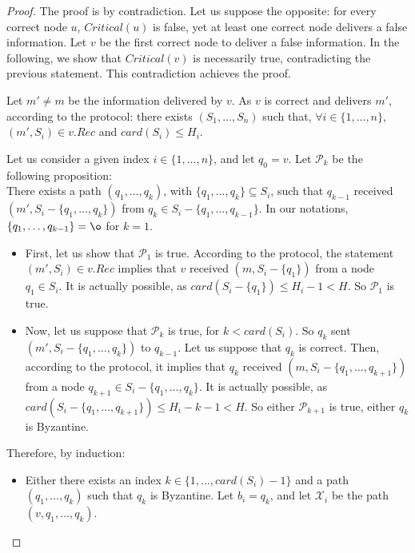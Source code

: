 \documentclass[a4paper,11pt]{article}
\begin{document}
\begin{proof}
The proof is by contradiction. Let us suppose the opposite: for every correct node $u$, $Critical(u)$ is false, yet at least one correct node delivers a false information.
Let $v$ be the first correct node to deliver a false information.
In the following, we show that $Critical(v)$ is necessarily true, contradicting the previous statement. This contradiction achieves the proof.


Let $m' \neq m$ be the information delivered by $v$.
As $v$ is correct and delivers $m'$, according to the protocol: there exists $(S_1,\dots,S_n)$ such that,
$\forall i \in \{1,\dots,n\}$, $(m',S_i) \in v.Rec$ and $card(S_i) \leq H_i$.


Let us consider a given index $i \in \{1,\dots,n\}$, and let $q_0 = v$. Let $\mathcal{P}_k$ be the following proposition:
\\There exists a path $(q_1,\dots,q_k)$, with $\{q_1,\dots,q_k\} \subseteq S_i$, such that $q_{k-1}$ received $(m',S_i-\{q_1,\dots,q_k\})$ from $q_k \in S_i - \{q_1,\dots,q_{k-1}\}$.
In our notations, $\{q_1,\dots,q_{k-1}\} = \o$ for $k = 1$.

\begin{itemize}

\item First, let us show that $\mathcal{P}_1$ is true.
According to the protocol, the statement $(m',S_i) \in v.Rec$ implies that $v$ received $(m,S_i-\{q_1\})$ from a node $q_1 \in S_i$.
It is actually possible, as $card(S_i - \{q_1\}) \leq H_i - 1 < H$.
So $\mathcal{P}_1$ is true.

\item  Now, let us suppose that $\mathcal{P}_k$ is true, for $k < card(S_i)$.
So $q_k$ sent $(m',S_i-\{q_1,\dots,q_k\})$ to $q_{k-1}$. Let us suppose that $q_k$ is correct. Then, according to the protocol, it implies that 
$q_k$ received $(m,S_i-\{q_1,\dots,q_{k+1}\})$ from a node $q_{k+1} \in S_i-\{q_1,\dots,q_k\}$.
It is actually possible, as $card(S_i - \{q_1,\dots,q_{k+1}\}) \leq H_i - k - 1 < H$. So either $\mathcal{P}_{k+1}$ is true, either $q_k$ is Byzantine.
\end{itemize}


Therefore, by induction:

\begin{itemize}
\item Either there exists an index $k \in \{1,\dots,card(S_i)-1\}$ and a path $(q_1,\dots,q_k)$ such that $q_k$ is Byzantine. Let $b_i = q_k$, and let $\mathcal{X}_i$ be the path $(v,q_1,\dots,q_k)$.


\end{itemize}
\end{proof}
\end{document}

